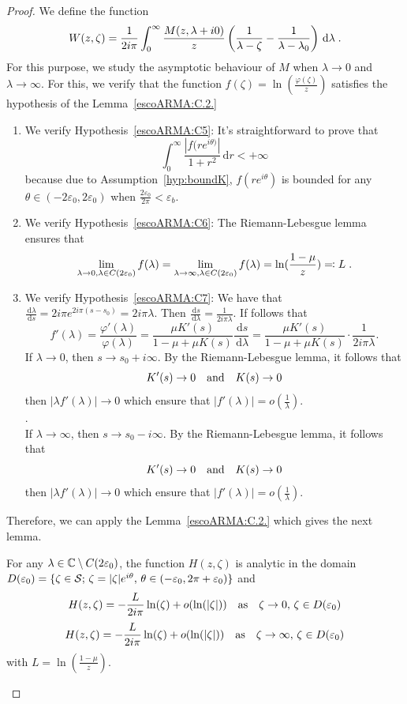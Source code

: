 \documentclass[11pt]{amsart}
\newcommand{\diff}{\,\mathrm{d}}
\begin{document}
\begin{proof}
We define the function
\begin{align}\label{def:W}
    W(z, \zeta) = \frac{1}{2i\pi }\int_0^\infty  \frac{M(z,\lambda+i0)}{z}\left( \frac{1}{\lambda-\zeta} - \frac{1}{\lambda-\lambda_0}\right) \diff \lambda 
    \eqfinp
\end{align}
For this purpose, we study the asymptotic behaviour of $M$ when $\lambda \to 0$ and $\lambda \to \infty$. For this, we verify that the function $f(\zeta) = \ln(\frac{\varphi(\zeta)}{z})$ satisfies the hypothesis of the Lemma~\ref{escoARMA:C.2.}
\begin{enumerate}
\item We verify Hypothesis~\eqref{escoARMA:C5}: It's straightforward to prove that 
    $$\int_0^\infty \frac{|f(r e^{i\theta)}|}{1+r^2}\diff r < +\infty$$ because due to Assumption~\ref{hyp:boundK}, $f(re^{i\theta})$ is bounded for any $\theta \in (-2\varepsilon_0, 2\varepsilon_0)$ when $\frac{2\varepsilon_0}{2\pi} < \varepsilon_b$. 
    \item We verify Hypothesis~\eqref{escoARMA:C6}: The Riemann-Lebesgue lemma ensures that 
    $$ \lim_{\lambda \to 0, \lambda \in C(2\varepsilon_0)} f(\lambda) = 
     \lim_{\lambda \to \infty, \lambda \in C(2\varepsilon_0)} f(\lambda)=\ln(\frac{1-\mu}{z}) 
 \eqqcolon L\; .$$
    \item We verify Hypothesis~\eqref{escoARMA:C7}: We have that $\frac{\diff \lambda}{\diff s} = 2i\pi e^{2i\pi(s-s_0)} = 2i\pi \lambda$. Then 
    $\frac{\diff s}{\diff \lambda} = \frac{1}{2i\pi\lambda}$. 
    If follows that 
    $$f'(\lambda) = \frac{\varphi'(\lambda)}{\varphi(\lambda)} = \frac{\mu K'(s)}{1 - \mu + \mu K(s)}\frac{\diff s}{\diff \lambda} = \frac{\mu K'(s)}{1 - \mu + \mu K(s)} \cdot \frac{1}{2i\pi\lambda}. $$
    If $\lambda \to 0$, then $s \to s_0+i\infty$. By the Riemann-Lebesgue lemma, it follows that $$K'(s) \to 0 \quad \text{and} \quad K(s) \to 0$$ then  $|\lambda f'(\lambda)| \to 0$ which ensure that $|f'(\lambda)| = o(\frac{1}{\lambda})$. \\. \\
    If $\lambda \to \infty$, then $s \to s_0-i\infty$. By the Riemann-Lebesgue lemma, it follows that $$K'(s) \to 0 \quad \text{and} \quad K(s) \to 0$$ then  $|\lambda f'(\lambda)| \to 0$ which ensure that $|f'(\lambda)| = o(\frac{1}{\lambda})$. \\
\end{enumerate}
Therefore, we can apply the Lemma~\ref{escoARMA:C.2.} which gives the next lemma. 

\begin{lemma}\label{EscARMA:C2}For any $\lambda \in \mathbb{C} \setminus C(2\varepsilon_0)$, the function $H(z,\zeta)$ is analytic in the domain $D(\varepsilon_0) = \{ \zeta \in \mathcal{S}; \, \zeta = |\zeta|e^{i\theta}, \, \theta \in (-\varepsilon_0, 2\pi+\varepsilon_0)\}$ and 
$$ H(z, \zeta) = -\frac{L}{2i\pi } \ln(\zeta) + o(\ln(|\zeta|)) \quad \text{as} \quad \zeta\to 0,\, \zeta \in D(\varepsilon_0)$$ 
$$ H(z, \zeta) = -\frac{L}{2i\pi } \ln(\zeta) + o(\ln(|\zeta|)) \quad \text{as} \quad \zeta\to \infty,\, \zeta \in D(\varepsilon_0)$$ 
with $L = \ln(\frac{1-\mu}{z})$. 
\end{lemma}


\end{proof}
\end{document}
